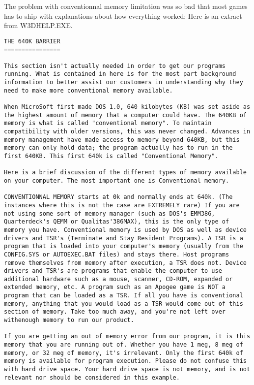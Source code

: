 \documentclass[book.tex]{subfiles}
\begin{document}
The problem with conventionnal memory limitation was so bad that most games has to ship with explanations about how everything worked: Here is an extract from W3DHELP.EXE.\\

 
   \begin{lstlisting}[breaklines=true,breakindent=0em]
THE 640K BARRIER
================

This section isn't actually needed in order to get our programs running. What is contained in here is for the most part background information to better assist our customers in understanding why they need to make more conventional memory available.

When MicroSoft first made DOS 1.0, 640 kilobytes (KB) was set aside as the highest amount of memory that a computer could have. The 640KB of memory is what is called "conventional memory". To maintain compatibility with older versions, this was never changed. Advances in memory management have made access to memory beyond 640KB, but this memory can only hold data; the program actually has to run in the first 640KB. This first 640k is called "Conventional Memory".

Here is a brief discussion of the different types of memory available on your computer. The most important one is Conventional memory.

CONVENTIONNAL MEMORY starts at 0k and normally ends at 640k. (The instances where this is not the case are EXTREMELY rare) If you are not using some sort of memory manager (such as DOS's EMM386, Quarterdeck's QEMM or Qualitas'386MAX), this is the only type of memory you have. Conventional memory is used by DOS as well as device drivers and TSR's (Terminate and Stay Resident Programs). A TSR is a program that is loaded into your computer's memory (usually from the CONFIG.SYS or AUTOEXEC.BAT files) and stays there. Host programs remove themselves from memory after execution, a TSR does not. Device drivers and TSR's are programs that enable the computer to use additional hardware such as a mouse, scanner, CD-ROM, expanded or extended memory, etc. A program such as an Apogee game is NOT a program that can be loaded as a TSR. If all you have is conventional memory, anything that you would load as a TSR would come out of this section of memory. Take too much away, and you're not left over withenough memory to run our product. 

If you are getting an out of memory error from our program, it is this memory that you are running out of. Whether you have 1 meg, 8 meg of memory, or 32 meg of memory, it's irrelevant. Only the first 640k of memory is available for program execution. Please do not confuse this with hard drive space. Your hard drive space is not memory, and is not relevant nor should be considered in this example.


\end{lstlisting}
\end{document}
